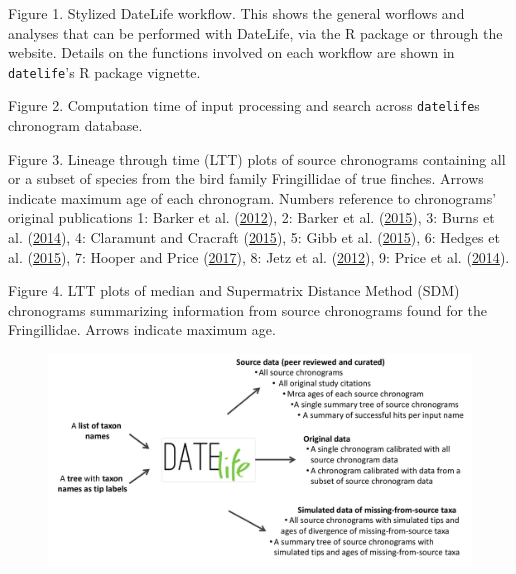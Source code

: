\documentclass[]{article}
\title{}
\author{}
\date{}
\begin{document}
{
\setcounter{tocdepth}{2}
\tableofcontents
}
Figure 1.
Stylized DateLife workflow. This shows the general worflows and analyses that can be performed with DateLife, via the R package or through the website. Details on the functions involved on each workflow are shown in \texttt{datelife}'s R package vignette.

Figure 2.
Computation time of input processing and search across \texttt{datelife}s chronogram database.

Figure 3.
Lineage through time (LTT) plots of source chronograms containing all or a subset of species from the bird family Fringillidae of true finches. Arrows indicate maximum age of each chronogram. Numbers reference to chronograms' original publications 1: Barker et al. (\protect\hyperlink{ref-barker2012going}{2012}), 2: Barker et al. (\protect\hyperlink{ref-barker2015new}{2015}), 3: Burns et al. (\protect\hyperlink{ref-burns2014phylogenetics}{2014}), 4: Claramunt and Cracraft (\protect\hyperlink{ref-claramunt2015new}{2015}), 5: Gibb et al. (\protect\hyperlink{ref-gibb2015new}{2015}), 6: Hedges et al. (\protect\hyperlink{ref-Hedges2015}{2015}), 7: Hooper and Price (\protect\hyperlink{ref-hooper2017chromosomal}{2017}), 8: Jetz et al. (\protect\hyperlink{ref-Jetz2012}{2012}), 9: Price et al. (\protect\hyperlink{ref-price2014niche}{2014}).

Figure 4.
LTT plots of median and Supermatrix Distance Method (SDM) chronograms summarizing information from source chronograms found for the Fringillidae. Arrows indicate maximum age.

\newpage

\begin{figure}[!h]
\includegraphics{Fig1.pdf}
\caption{}
\label{fig:workflow}
\end{figure}

\newpage
\end{document}
